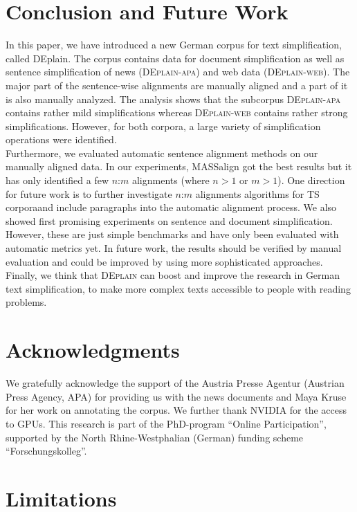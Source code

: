 \documentclass[11pt]{article}
\begin{document}
\section{Conclusion and Future Work}
In this paper, we have introduced a new German corpus for text simplification, 
called DEplain. The corpus contains data for document simplification as well as sentence simplification of news (\textsc{DEplain-apa}) and web data (\textsc{DEplain-web}). 
The major part of the sentence-wise alignments are manually aligned and a part of it is also manually analyzed. The analysis shows that the subcorpus \textsc{DEplain-apa} contains rather mild simplifications whereas \textsc{DEplain-web} contains rather strong simplifications. However, for both corpora, a large variety of simplification operations were identified. \\
Furthermore, we evaluated automatic sentence alignment methods on our manually aligned data. In our experiments, MASSalign got the best results but it has only identified a few $n$:$m$ alignments (where $n>1$ or $m>1$). One direction for future work is to further investigate $n$:$m$ alignments algorithms for TS corporaand include paragraphs into the automatic alignment process. We also showed first promising experiments on sentence and document simplification. However, these are just simple benchmarks and have only been evaluated with automatic metrics yet. In future work, the results should be verified by manual evaluation and could be improved by 
using more sophisticated approaches.
Finally, we think that \textsc{DEplain} can boost and improve the research in German text simplification, to make more complex texts accessible to people with reading problems.

\newpage



\section*{Acknowledgments}
We gratefully acknowledge  the support of the Austria Presse Agentur (Austrian Press Agency, APA) for providing us with the news documents and Maya Kruse for her work on annotating the corpus. We further thank  NVIDIA for the access to GPUs. This research is part of the PhD-program ``Online Participation'', supported by the North Rhine-Westphalian (German) funding scheme ``Forschungskolleg''.


\section*{Limitations }
\end{document}
